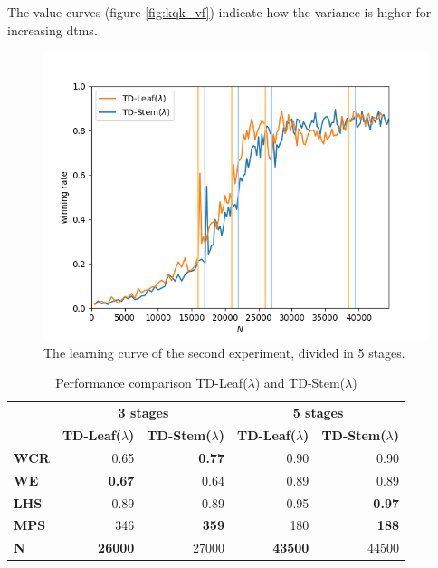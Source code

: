 The value curves (figure \ref{fig:kqk_vf}) indicate how the variance is higher for increasing \glspl{dtm}.

\begin{figure}
\centering
\includegraphics[scale=0.8]{fig/plots/kqk_lc}
\caption[Learning curve of the second experiment]{The learning curve of the second experiment, divided in 5 stages.}
\label{fig:lc_kqk}
\end{figure}


\begin{table}[]
\centering
\caption{Performance comparison TD-Leaf($\lambda$) and TD-Stem($\lambda$)}
\label{tab:perf_kqk}
\begin{tabular}{l|rr|rr}
& \multicolumn{2}{c|}{\textbf{3 stages}} & \multicolumn{2}{c}{\textbf{5 stages}} \\

    &\multicolumn{1}{l}{\textbf{TD-Leaf($\lambda$)}} & \multicolumn{1}{l|}{\textbf{TD-Stem($\lambda$)}}&\multicolumn{1}{l}{\textbf{TD-Leaf($\lambda$)}} & \multicolumn{1}{l}{\textbf{TD-Stem($\lambda$)}} \\ \hline
\textbf{WCR} & 0.65 & \textbf{0.77} & 0.90                                  & 0.90                          \\
\textbf{WE} & \textbf{0.67} & 0.64 & 0.89                          & 0.89                                   \\
\textbf{LHS} & 0.89 & 0.89 & 0.95                                   & \textbf{0.97}                          \\
\textbf{MPS} & 346 & \textbf{359} & 180                           & \textbf{188}                                    \\
\textbf{N } & \textbf{26000} & 27000  & \textbf{43500}                                & 44500                      
\end{tabular}
\end{table}


